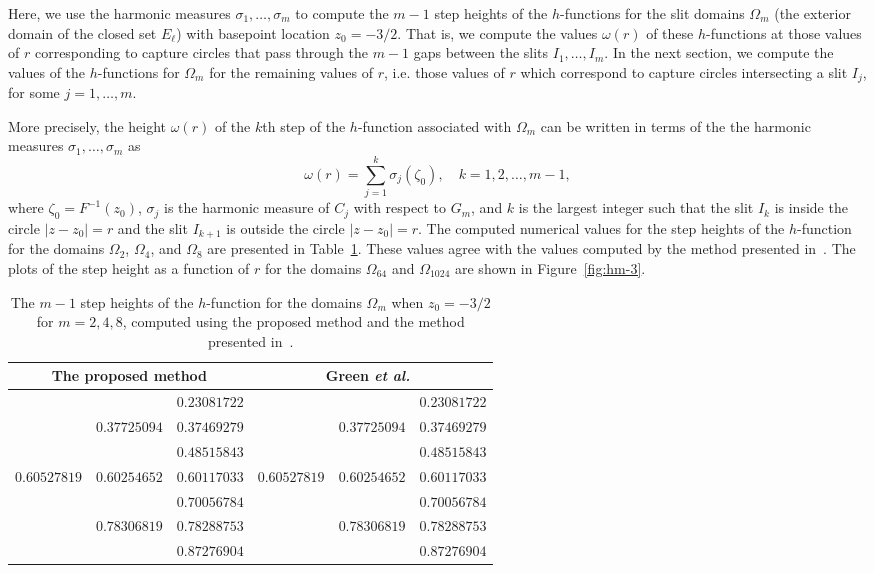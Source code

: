 Here, we use the harmonic measures $\sigma_1,\ldots,\sigma_m$ to compute the $m-1$ step heights of the $h$-functions for the slit domains $\Omega_m$ (the exterior domain of the closed set $E_\ell$) with basepoint location $z_0=-3/2$. That is, we compute the values $\omega(r)$ of these $h$-functions at those values of $r$ corresponding to capture circles that pass through the $m-1$ gaps between the slits $I_1,\ldots,I_m$. 
In the next section, we compute the values of the $h$-functions for $\Omega_m$ for the remaining values of $r$, i.e. those values of $r$ which correspond to capture circles intersecting a slit $I_{j}$, for some $j=1,\ldots,m$. 

More precisely, the height $\omega(r)$ of the $k$th step of the $h$-function associated with $\Omega_m$ can be written in terms of the the harmonic measures $\sigma_1,\ldots,\sigma_m$ as 
\begin{equation}\label{eq:wr-3}
\omega(r)=\sum_{j=1}^{k}\sigma_j(\zeta_0), \quad k=1,2,\ldots,m-1,
\end{equation}
where $\zeta_0=F^{-1}(z_0)$, $\sigma_j$ is the harmonic measure of $C_j$ with respect to $G_m$, and $k$ is the largest integer such that the slit $I_{k}$ is inside the circle $|z-z_0|=r$ and the slit $I_{k+1}$ is outside the circle $|z-z_0|=r$.
The computed numerical values for the step heights of the $h$-function for the domains $\Omega_2$, $\Omega_4$, and $\Omega_8$ are presented in Table~\ref{tab:3}. These values agree with the values computed by the method presented in~\cite{gswc}. The plots of the step height as a function of $r$ for the domains $\Omega_{64}$ and $\Omega_{1024}$ are shown in Figure~\ref{fig:hm-3}.

\begin{table}[h]
  \caption{The $m-1$ step heights of the $h$-function for the domains $\Omega_m$ when $z_0=-3/2$ for $m=2,4,8$, computed using the proposed method and the method presented in~\cite{gswc}.}
	\label{tab:3}
	\centering
	\begin{tabular}{lll|lll}  \hline
		 \multicolumn{3}{c|}{The proposed method}  & \multicolumn{3}{c}{Green \emph{et al.}~\cite{gswc}}  \\ \hline
              &              & $0.23081722$  &              &              & $0.23081722$  \\ 
              & $0.37725094$ & $0.37469279$  &              & $0.37725094$ & $0.37469279$ \\
              &              & $0.48515843$  &              &              & $0.48515843$ \\
 $0.60527819$ & $0.60254652$ & $0.60117033$  & $0.60527819$ & $0.60254652$ & $0.60117033$ \\
              &              & $0.70056784$  &              &              & $0.70056784$ \\
              & $0.78306819$ & $0.78288753$  &              & $0.78306819$ & $0.78288753$ \\
              &              & $0.87276904$  &              &              & $0.87276904$ \\
		\hline
	\end{tabular}
\end{table}


